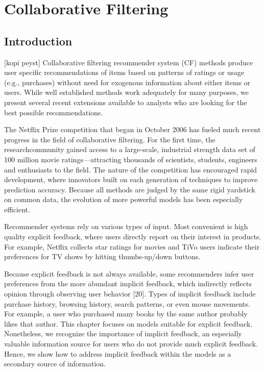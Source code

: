 
\chapter{Collaborative Filtering}\label{chapter:collaborative_filtering}

\section{Introduction}
[kopi peyst]
Collaborative filtering recommender system (CF) methods produce user specific recommendations of items based on patterns of ratings or usage (e.g., purchases) without need for exogenous information about either items or users. While well established methods work adequately for many purposes, we present several recent extensions available to analysts who are looking for the best possible recommendations.

The Netflix Prize competition that began in October 2006 has fueled much recent progress in the field of collaborative filtering. For the first time, the researchcommunity gained access to a large-scale, industrial strength data set of 100 million movie ratings—attracting thousands of scientists, students, engineers and enthusiasts to the field. The nature of the competition has encouraged rapid development, where innovators built on each generation of techniques to improve prediction accuracy. Because all methods are judged by the same rigid yardstick on common data, the evolution of more powerful models has been especially efficient.

Recommender systems rely on various types of input. Most convenient is high quality explicit feedback, where users directly report on their interest in products. For example, Netflix collects star ratings for movies and TiVo users indicate their preferences for TV shows by hitting thumbs-up/down buttons.

Because explicit feedback is not always available, some recommenders infer user preferences from the more abundant implicit feedback, which indirectly reflects opinion through observing user behavior [20]. Types of implicit feedback include purchase history, browsing history, search patterns, or even mouse movements. For example, a user who purchased many books by the same author probably likes that author. This chapter focuses on models suitable for explicit feedback. Nonetheless, we recognize the importance of implicit feedback, an especially valuable information source for users who do not provide much explicit feedback. Hence, we show how to address implicit feedback within the models as a secondary source of information.

